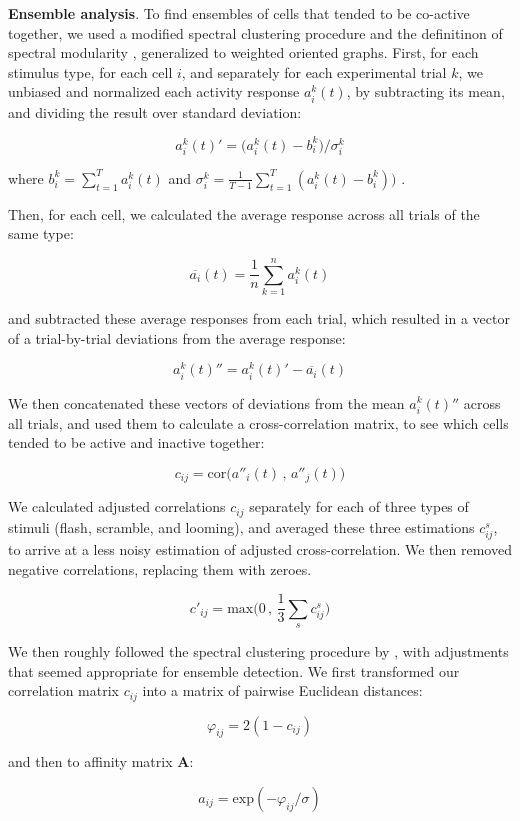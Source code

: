 \documentclass{article}
\begin{document}
\textbf{Ensemble analysis}. To find ensembles of cells that tended to be co-active together, we used a modified spectral clustering procedure \citep{ng2002spectral} and the definitinon of spectral modularity \citep{newman2006modularity}, generalized to weighted oriented graphs. First, for each stimulus type, for each cell $i$, and separately for each experimental trial $k$, we unbiased and normalized each activity response $a^k_i(t)$, by subtracting its mean, and dividing the result over standard deviation:

\[ a^k_i(t)' = \big(a^k_i(t)-b^k_i\big)/\sigma^k_i \]

where $b^k_i = \sum_{t=1}^T{a^k_i(t)}$ and $\sigma^k_i = \frac{1}{T-1}\sum_{t=1}^T{(a^k_i(t) - b^k_i))}$ .

Then, for each cell, we calculated the average response across all trials of the same type: 

\[ \overline{a_i}(t) = \frac{1}{n}\sum_{k=1}^n{a^k_i(t)} \]

and subtracted these average responses from each trial, which resulted in a vector of a trial-by-trial deviations from the average response:

\[ a^k_i(t)'' = a^k_i(t)' - \overline{a_i}(t) \]

We then concatenated these vectors of deviations from the mean $a^k_i(t)''$ across all trials, and used them to calculate a cross-correlation matrix, to see which cells tended to be active and inactive together:

\[ c_{ij} = \text{cor}\big(a''_i(t)\, , \, a''_j(t)\big) \]

We calculated adjusted correlations $c_{ij}$ separately for each of three types of stimuli (flash, scramble, and looming), and averaged these three estimations $c_{ij}^s$, to arrive at a less noisy estimation of adjusted cross-correlation. We then removed negative correlations, replacing them with zeroes.

\[ c'_{ij} = \text{max}\big(0 \, , \, \frac{1}{3} \sum_{s}{c_{ij}^s}\big) \]

We then roughly followed the spectral clustering procedure by \citep{ng2002spectral}, with adjustments that seemed appropriate for ensemble detection. We first transformed our correlation matrix $c_{ij}$ into a matrix of pairwise Euclidean distances:

\[ \varphi_{ij} = 2(1-c_{ij}) \]

and then to affinity matrix $\textbf{A}$:

\[ a_{ij} = \text{exp}(-\varphi_{ij}/\sigma) \]
\end{document}
